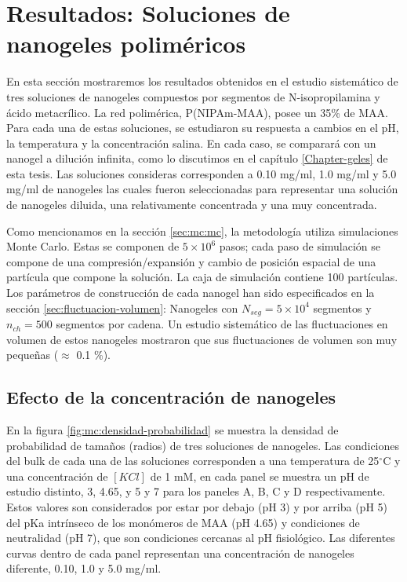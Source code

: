 	\section{Resultados: Soluciones de nanogeles polim\'ericos}
	
	En esta secci\'on mostraremos los resultados obtenidos en el estudio sistem\'atico de tres soluciones de nanogeles compuestos por segmentos de N-isopropilamina y \'acido metacr\'ilico. La red polim\'erica, P(NIPAm-MAA), posee un 35\% de MAA. Para cada una de estas soluciones, se estudiaron su respuesta a cambios en el pH, la temperatura y la concentraci\'on salina. En cada caso, se comparar\'a con un nanogel a diluci\'on infinita, como lo discutimos en el cap\'itulo \ref{Chapter-geles} de esta tesis. Las soluciones consideras corresponden a 0.10 mg/ml, 1.0 mg/ml y 5.0 mg/ml  de nanogeles las cuales fueron seleccionadas para representar una soluci\'on de nanogeles diluida, una relativamente concentrada y una muy concentrada.
	
	Como mencionamos en la secci\'on \ref{sec:mc:mc}, la metodolog\'ia utiliza simulaciones Monte Carlo. Estas se componen de $5\times 10^6$ pasos; cada paso de simulaci\'on se compone de una compresi\'on/expansi\'on y cambio de posici\'on espacial de una part\'icula que compone la soluci\'on. La caja de simulaci\'on contiene 100 part\'iculas. Los par\'ametros de construcci\'on de cada nanogel han sido especificados en la secci\'on \ref{sec:fluctuacion-volumen}: Nanogeles con $N_{seg} = 5 \times10^4$ segmentos y $n_{ch} = 500$ segmentos por cadena. Un estudio sistem\'atico de las fluctuaciones en volumen de estos nanogeles mostraron que sus fluctuaciones de volumen son muy peque\~nas ($\approx$ 0.1 $\%$). %
	
	
	
	\subsection{Efecto de la concentraci\'on de nanogeles}
	En la figura \ref{fig:mc:densidad-probabilidad} se muestra la densidad de probabilidad de tama\~nos (radios) de tres soluciones de nanogeles. Las condiciones del bulk de cada una de las soluciones corresponden a una temperatura de 25$^\circ$C y una concentraci\'on de $[KCl]$ de 1 mM, en cada panel se muestra un pH de estudio distinto, 3, 4.65, y 5 y 7 para los paneles A, B, C y D respectivamente. Estos valores son considerados por estar por debajo (pH 3) y por arriba (pH 5) del pKa intr\'inseco de los mon\'omeros de MAA (pH 4.65) y condiciones de neutralidad (pH 7), que son condiciones cercanas al pH fisiol\'ogico. Las diferentes curvas dentro de cada panel representan una concentraci\'on de nanogeles diferente, 0.10, 1.0 y 5.0 mg/ml.
	
